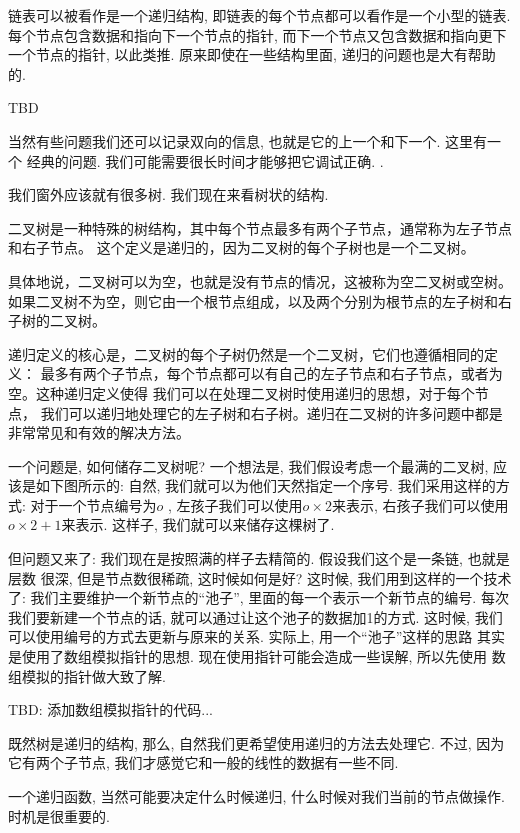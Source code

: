 链表可以被看作是一个递归结构, 即链表的每个节点都可以看作是一个小型的链表. 
每个节点包含数据和指向下一个节点的指针, 而下一个节点又包含数据和指向更下一个节点的指针, 
以此类推. 
原来即使在一些结构里面, 递归的问题也是大有帮助的. 

 TBD 

 当然有些问题我们还可以记录双向的信息, 也就是它的上一个和下一个. 这里有一个
经典的问题. 我们可能需要很长时间才能够把它调试正确. .


我们窗外应该就有很多树. 我们现在来看树状的结构. 

二叉树是一种特殊的树结构，其中每个节点最多有两个子节点，通常称为左子节点和右子节点。
这个定义是递归的，因为二叉树的每个子树也是一个二叉树。

具体地说，二叉树可以为空，也就是没有节点的情况，这被称为空二叉树或空树。
如果二叉树不为空，则它由一个根节点组成，以及两个分别为根节点的左子树和右子树的二叉树。

递归定义的核心是，二叉树的每个子树仍然是一个二叉树，它们也遵循相同的定义：
最多有两个子节点，每个节点都可以有自己的左子节点和右子节点，或者为空。这种递归定义使得
我们可以在处理二叉树时使用递归的思想，对于每个节点，
我们可以递归地处理它的左子树和右子树。递归在二叉树的许多问题中都是非常常见和有效的解决方法。

一个问题是, 如何储存二叉树呢? 一个想法是, 我们假设考虑一个最满的二叉树, 应该是如下图所示的: 
自然, 我们就可以为他们天然指定一个序号. 我们采用这样的方式: 对于一个节点编号为$o$
, 左孩子我们可以使用$o\times 2$来表示, 右孩子我们可以使用$o\times 2+1$来表示. 
这样子, 我们就可以来储存这棵树了. 

但问题又来了: 我们现在是按照满的样子去精简的. 假设我们这个是一条链, 也就是层数
很深, 但是节点数很稀疏, 这时候如何是好? 这时候, 我们用到这样的一个技术了:
我们主要维护一个新节点的``池子'', 里面的每一个表示一个新节点的编号.
每次我们要新建一个节点的话, 就可以通过让这个池子的数据加1的方式. 这时候, 我们 
可以使用编号的方式去更新与原来的关系. 实际上, 用一个``池子''这样的思路
其实是使用了数组模拟指针的思想. 现在使用指针可能会造成一些误解, 所以先使用
数组模拟的指针做大致了解. 

TBD: 添加数组模拟指针的代码...

既然树是递归的结构, 那么, 自然我们更希望使用递归的方法去处理它. 不过, 
因为它有两个子节点, 我们才感觉它和一般的线性的数据有一些不同. 

一个递归函数, 当然可能要决定什么时候递归, 什么时候对我们当前的节点做操作. 
时机是很重要的. 

